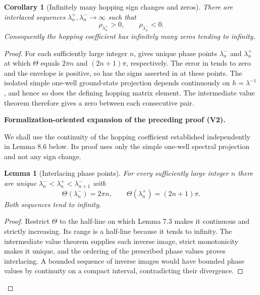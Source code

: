 \documentclass[11pt]{article}
\newtheorem{lemma}[theorem]{Lemma}
\newtheorem{corollary}[theorem]{Corollary}
\newcommand{\formalisationparentid}{X}
\newenvironment{formalisationaddition}[1]{\par\medskip\begingroup\color{blue}\def\formalisationparentid{#1}\setcounter{formalizationsublemma}{0}\let\lemma\formalizationsublemma\let\endlemma\endformalizationsublemma
  \def\Eo{\mathcal E_h^\circ}\def\EE{\mathcal E_h}\def\phio{\phi_h^\circ}\def\phih{\phi_h}\def\Ho{H_h^{\rm atom}(v^\circ)}\def\Ha{H_h^{\rm atom}}\def\HL{H_h^{L}}\def\Dh{D_h}\def\Log{\operatorname{Log}}\def\ellh{\ell_h}\def\Gp{G_{p,h}}\def\Ast{A_{*,h}}\def\ahat{\widehat{\mathfrak a}_h}\def\ah{\mathfrak a_h}\def\rh{\widehat\rho_h}\def\deltah{\widehat\delta_h}\def\oldref##1{\textup{(##1)}}\def\interface##1{\par\noindent\textit{Analytical interface used here.} ##1\par}\def\finish{\par\noindent\textit{Conclusion of the formalization-oriented expansion.} }\par\noindent\textbf{Formalization-oriented expansion of the preceding proof (V2).}\par\smallskip
}{\par\endgroup\medskip
}
\begin{document}
\begin{corollary}[Infinitely many hopping sign changes and zeros]
\label{cor:hopping-zeros}
There are interlaced sequences
$\lambda_n^+,\lambda_n^-\to\infty$ such that
\begin{equation}\label{eq:hopping-signs}
 \rho_{\lambda_n^+}>0,
 \qquad
 \rho_{\lambda_n^-}<0.
\end{equation}
Consequently the hopping coefficient has infinitely many zeros tending to
infinity.
\end{corollary}

\begin{proof}
For each sufficiently large integer $n$, 
gives unique phase points $\lambda_n^-$ and $\lambda_n^+$ at which
$\Theta$ equals $2\pi n$ and $(2n+1)\pi$, respectively.  The error in
 tends to zero and the envelope is positive, so
 has the signs asserted in  at
these points.  The isolated simple one-well ground-state projection depends
continuously on $h=\lambda^{-1}$, and hence so does the defining hopping
matrix element.  The intermediate value theorem therefore gives a zero
between each consecutive pair.

\begin{formalisationaddition}{C7.4}
We shall use the continuity of the hopping coefficient established independently in Lemma 8.6 below. Its proof uses only the simple one-well spectral projection and not any sign change.

\begin{lemma}[Interlacing phase points]\label{sublemma:C7-4-phase-points}
For every sufficiently large integer $n$ there are unique $\lambda_n^-<\lambda_n^+<\lambda_{n+1}^-$ with
\[
 \Theta(\lambda_n^-)=2\pi n,\qquad
 \Theta(\lambda_n^+)=(2n+1)\pi.
\]
Both sequences tend to infinity.
\end{lemma}
\begin{proof}
Restrict $\Theta$ to the half-line on which Lemma 7.3 makes it continuous and strictly increasing. Its range is a half-line because it tends to infinity. The intermediate value theorem supplies each inverse image, strict monotonicity makes it unique, and the ordering of the prescribed phase values proves interlacing. A bounded sequence of inverse images would have bounded phase values by continuity on a compact interval, contradicting their divergence.
\end{proof}


\end{formalisationaddition}
\end{proof}
\end{document}
